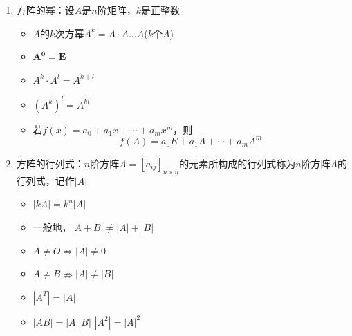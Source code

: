 \documentclass[./linear_algebra.tex]{subfiles}
\begin{document}
\begin{enumerate}
\begin{itemize}
            \item $(A^T)^T = A$
            \item $(kA)^T = kA^T$
            \item $(A + B)^T = A^T + B^T$
            \item $(A - B)^T = A^T - B^T$
            \item $(AB)^T = B^{T}A^T $
            \item $(E + A)^T = E + A^T $
            \item
            \[
                \begin{bmatrix}
                    A & B \\
                    C & D
                \end{bmatrix}^{T}
                = \begin{bmatrix}
                      A^T & C^T \\
                      B^T & D^T
                \end{bmatrix}
            \]
        \end{itemize}
        \item 方阵的幂：设$A$是$n$阶矩阵，$k$是正整数
        \begin{itemize}
            \item $A$的$k$次方幂$A^k = A \cdot A \dots A$($k$个$A$)
            \item $\mathbf{A^0 = E}$
            \item $A^k \cdot A^l = A^{k+l}$
            \item $(A^k)^l = A^{kl}$
            \item 若$f(x) = a_0 + a_{1}x + \cdots + a_{m}x^m$，则
            \[
                f(A) = a_{0}E + a_{1}A + \cdots + a_{m}A^m
            \]
        \end{itemize}
        \item 方阵的行列式：$n$阶方阵$A = [a_{ij}]_{n \times n}$的元素所构成的行列式称为$n$阶方阵$A$的行列式，记作$|A|$
        \begin{itemize}
            \item $|kA| = k^{n}|A|$
            \item 一般地，$|A + B| \neq |A| + |B|$
            \item $A \neq O \nRightarrow |A| \neq 0$
            \item $A \neq  B \nRightarrow |A| \neq |B|$
            \item $|A^T| = |A|$
            \item $|AB| = |A||B|$ \;\text{,} $|A^2| = |A|^2$

\end{itemize}
\end{enumerate}
\end{document}
